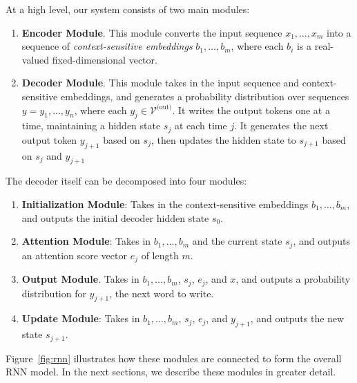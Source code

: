 \documentclass[11pt,letterpaper]{article}
\newcommand{\vocabout}{\mathcal{V}^{\text{(out)}}}
\newcommand\pl[1]{\textcolor{red}{[PL: #1]}}
\newcommand\rj[1]{\textcolor{blue}{[RJ: #1]}}
\renewcommand\pl[1]{}
\renewcommand\rj[1]{}
\begin{document}
At a high level, our system consists of two main modules:
\begin{enumerate}
  \item \textbf{Encoder Module}.  This module 
    converts the input sequence $x_1, \dotsc, x_m$
    into a sequence of \emph{context-sensitive embeddings}
    $b_1, \dotsc, b_m$,
    where each $b_i$ is a real-valued fixed-dimensional vector.
  \item \textbf{Decoder Module}.  This module
    takes in the input sequence and context-sensitive embeddings,
    and generates a probability distribution
    over sequences $y = y_1, \dotsc, y_n$,
    where each $y_j \in \vocabout$.
    It writes the output tokens one at a time,
    maintaining a hidden state $s_j$ at each time $j$.
    It generates the next output token $y_{j+1}$ based on $s_j$,
    then updates the hidden state to $s_{j+1}$ based on
    $s_j$ and $y_{j+1}$
\end{enumerate}
The decoder itself can be decomposed into four modules:
\begin{enumerate}
  \item \textbf{Initialization Module}:
    Takes in the context-sensitive embeddings $b_1, \dotsc, b_m$, and
    outputs the initial decoder hidden state $s_0$.
  \item \textbf{Attention Module}:
    Takes in $b_1, \dotsc, b_m$ and the current state $s_j$,
    and outputs an attention score vector $e_j$ of length $m$.
  \item \textbf{Output Module}.  
    Takes in $b_1, \dotsc, b_m$, $s_j$, $e_j$, and $x$,
    and outputs a probability distribution 
    for $y_{j+1}$, the next word to write.
  \item \textbf{Update Module}: 
    Takes in $b_1, \dotsc, b_m$, $s_j$, $e_j$, and $y_{j+1}$,
    and outputs the new state $s_{j+1}$.
\end{enumerate}
\pl{Move the second sentences in the three bullets into 'Decoder Module'
  and cut the first sentence.
  This text is currently taking up a lot of space and kind of wordy.
}
\rj{I couldn't really see moving it all into "Decoder Module".  How does this look?
Also, I realized that 4 modules makes more sense than 3.}
Figure~\ref{fig:rnn} illustrates how these modules are connected
to form the overall RNN model.
In the next sections, we describe these modules in greater detail.

\end{document}
